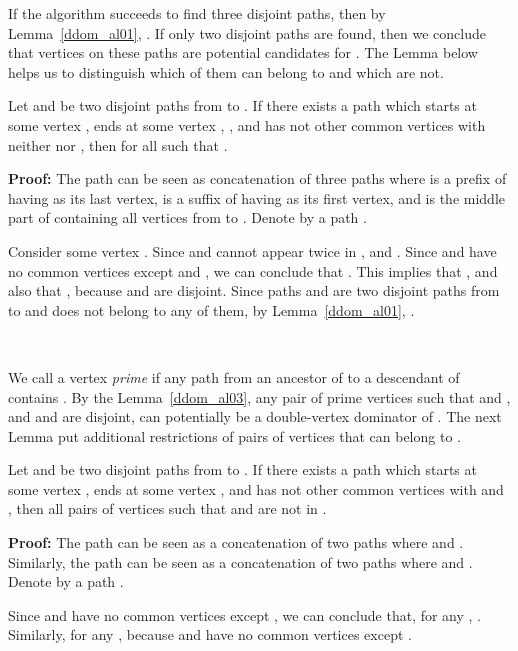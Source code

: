 \documentclass{llncs}
\begin{document}
If the algorithm succeeds to find three disjoint  paths,
then by Lemma~\ref{ddom_al01}, .
If only two disjoint  paths are found, then we conclude that vertices on
these paths are potential candidates for . The
Lemma below helps us to distinguish which of them 
can belong to  and which are not.



\begin{lemma} \label{ddom_al03}
Let  and  be two disjoint paths from  to . 
If there exists a path  which starts at some vertex ,
ends at some vertex , ,
and has not other common vertices with
neither  nor , then 
 for all  such that .
\end{lemma}
{\bf Proof:} 
The path  can be seen as concatenation of three paths
 where  is a prefix of  having 
as its last vertex,  is a suffix of  having 
as its first vertex, and  is the middle part of  containing
all vertices from  to .
Denote by  a path .

Consider some vertex . 
Since  and  cannot appear twice in 
,  and . Since
 and  have no common vertices except  and ,
we can conclude that . This implies that , and
also that , because  and 
 are disjoint. 
Since paths  and  are two disjoint paths from  to
 and  does not belong to any of them, by Lemma~\ref{ddom_al01},
.
\begin{flushright}
 \\
\end{flushright}





We call a vertex  {\em prime} if any path from 
an ancestor of  to a descendant of  contains .
By the Lemma~\ref{ddom_al03}, 
any pair of prime vertices  such that  and , 
and  and  are disjoint, can potentially be a double-vertex dominator of . 
The next Lemma put additional restrictions of pairs of vertices that can belong to
.

\begin{lemma} \label{ddom_al04}
Let  and  
be two disjoint paths from  to . 
If there exists a path  which starts at some vertex ,
ends at some vertex , and has not other common vertices with
 and , then all pairs of vertices  such that  
and  are not in .
\end{lemma}
{\bf Proof:} The path  can be seen as a concatenation of two paths
 where  and .  
Similarly, the path  can be seen as a concatenation of two
paths  where  and .
Denote by  a path .

Since  and  have no common vertices except , 
we can conclude that, for any , . Similarly, 
for any ,  
because  and  have no common vertices
except .
\end{document}
